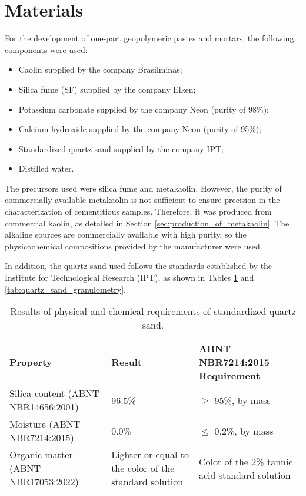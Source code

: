 \section{Materials}
\label{sec:materials}

For the development of one-part geopolymeric pastes and mortars, the following components were used:

\begin{itemize}
    \item Caolin supplied by the company Brasilminas;
    \item Silica fume (SF) supplied by the company Elken;
    \item Potassium carbonate supplied by the company Neon (purity of 98\%);
    \item Calcium hydroxide supplied by the company Neon  (purity of 95\%);
    \item Standardized quartz sand supplied by the company IPT;
    \item Distilled water.
\end{itemize}

The precursors used were silica fume and metakaolin. However, the purity of commercially available metakaolin is not sufficient to ensure precision in the characterization of cementitious samples.
Therefore, it was produced from commercial kaolin, as detailed in Section \ref{sec:production_of_metakaolin}.
The alkaline sources are commercially available with high purity, so the physicochemical compositions provided by the manufacturer were used.

In addition, the quartz sand used follows the standards established by the Institute for Technological Research (IPT), as shown in Tables \ref{tab:quartz_sand_properties} and \ref{tab:quartz_sand_granulometry}.

\begin{table}[H]
    \caption{Results of physical and chemical requirements of standardized quartz sand.}
    \label{tab:quartz_sand_properties}
    \center
    \begin{tabular}{p{} p{} p{}}
        \hline
        Property & Result & ABNT NBR7214:2015 Requirement\\
        \hline
        Silica content (ABNT NBR14656:2001) & 96.5\% & $\geq$ 95\%, by mass \\
        Moisture (ABNT NBR7214:2015) & 0.0\% & $\leq$ 0.2\%, by mass \\
        Organic matter (ABNT NBR17053:2022) & Lighter or equal to the color of the standard solution & Color of the 2\% tannic acid standard solution \\
        \hline
    \end{tabular}
\end{table}

